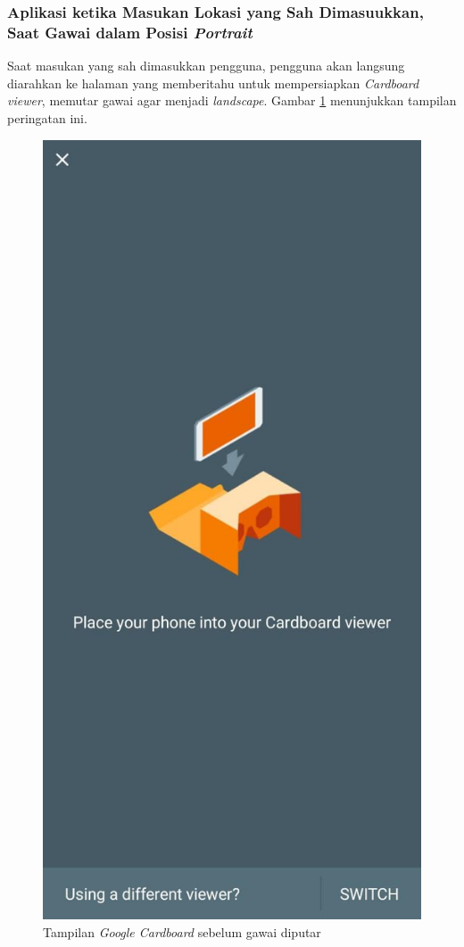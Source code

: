 \subsubsection{Aplikasi ketika Masukan Lokasi yang Sah Dimasuukkan, Saat Gawai dalam Posisi \textit{Portrait}}
Saat masukan yang sah dimasukkan pengguna, pengguna akan langsung diarahkan ke halaman yang memberitahu untuk mempersiapkan \textit{Cardboard viewer}, memutar gawai agar menjadi \textit{landscape}. Gambar \ref{fig:cardboard-page} menunjukkan tampilan peringatan ini.

\begin{figure}
\centering
\includegraphics[scale=0.2]{Gambar/cardboard-page.png}
    \caption{Tampilan \textit{Google Cardboard} sebelum gawai diputar}
    \label{fig:cardboard-page}
\end{figure}

